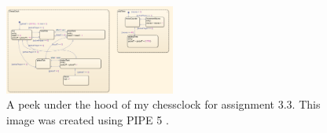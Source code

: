 \documentclass{article}
\newcommand{\subfigimg}[3][,]{%
	\setbox1=\hbox{\texttt{[image: \#3]}}%
	\leavevmode\rlap{\usebox1}%
	\rlap{\hspace*{0.9\linewidth}\raisebox{\dimexpr\ht1-1.75\baselineskip}{#2}}%
	\phantom{\usebox1}%
}
\begin{document}
	\begin{figure}
		\includegraphics[width=0.5\textwidth]{Ass3_3_chart}
		\caption{A peek under the hood of my chessclock for assignment 3.3. This image was created using PIPE 5 \cite{dingle2009pipe2, bonet2007pipe}. \label{fig:ass3_3_chart}}
	\end{figure}


%
	
	\newpage 

	
	
	
	

		
	
\end{document}
